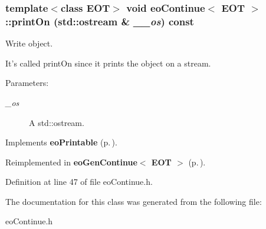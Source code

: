 \subsubsection{\setlength{\rightskip}{0pt plus 5cm}template$<$class EOT$>$ void {\bf eo\-Continue}$<$ {\bf EOT} $>$::print\-On (std::ostream \& {\em \_\-\_\-os}) const\hspace{0.3cm}{\tt  [inline, virtual]}}\label{classeo_continue_a2}


Write object. 

It's called print\-On since it prints the object on a stream. \begin{Desc}
\item[Parameters:]
\begin{description}
\item[{\em \_\-os}]A std::ostream. \end{description}
\end{Desc}


Implements {\bf eo\-Printable} {\rm (p.\,\pageref{classeo_printable_a1})}.

Reimplemented in {\bf eo\-Gen\-Continue$<$ EOT $>$} {\rm (p.\,\pageref{classeo_gen_continue_a7})}.

Definition at line 47 of file eo\-Continue.h.

The documentation for this class was generated from the following file:\begin{CompactItemize}
\item 
eo\-Continue.h\end{CompactItemize}
